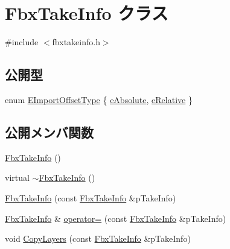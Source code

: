 \hypertarget{class_fbx_take_info}{}\section{Fbx\+Take\+Info クラス}
\label{class_fbx_take_info}


{\ttfamily \#include $<$fbxtakeinfo.\+h$>$}

\subsection*{公開型}
\begin{DoxyCompactItemize}
\item 
enum \hyperlink{class_fbx_take_info_a64a38a536155104dfa7bc79ffb7ef8dc}{E\+Import\+Offset\+Type} \{ \hyperlink{class_fbx_take_info_a64a38a536155104dfa7bc79ffb7ef8dca51c6f34964217ede4adc8c0975517f57}{e\+Absolute}, 
\hyperlink{class_fbx_take_info_a64a38a536155104dfa7bc79ffb7ef8dcad4ae9cdb8f45343878006508a84546df}{e\+Relative}
 \}
\end{DoxyCompactItemize}
\subsection*{公開メンバ関数}
\begin{DoxyCompactItemize}
\item 
\hyperlink{class_fbx_take_info_a0c99af4f277140834959403672643869}{Fbx\+Take\+Info} ()
\item 
virtual \hyperlink{class_fbx_take_info_aab3be12b6326df91b6dea9601e9f079f}{$\sim$\+Fbx\+Take\+Info} ()
\item 
\hyperlink{class_fbx_take_info_a5789a72ffbcf99bc3501f6d52ff3912e}{Fbx\+Take\+Info} (const \hyperlink{class_fbx_take_info}{Fbx\+Take\+Info} \&p\+Take\+Info)
\item 
\hyperlink{class_fbx_take_info}{Fbx\+Take\+Info} \& \hyperlink{class_fbx_take_info_abbce118f64f716e965162ddcaacc024b}{operator=} (const \hyperlink{class_fbx_take_info}{Fbx\+Take\+Info} \&p\+Take\+Info)
\item 
void \hyperlink{class_fbx_take_info_ac8e073b31c0de56fc7dbfcdd006d4f3f}{Copy\+Layers} (const \hyperlink{class_fbx_take_info}{Fbx\+Take\+Info} \&p\+Take\+Info)
\end{DoxyCompactItemize}
